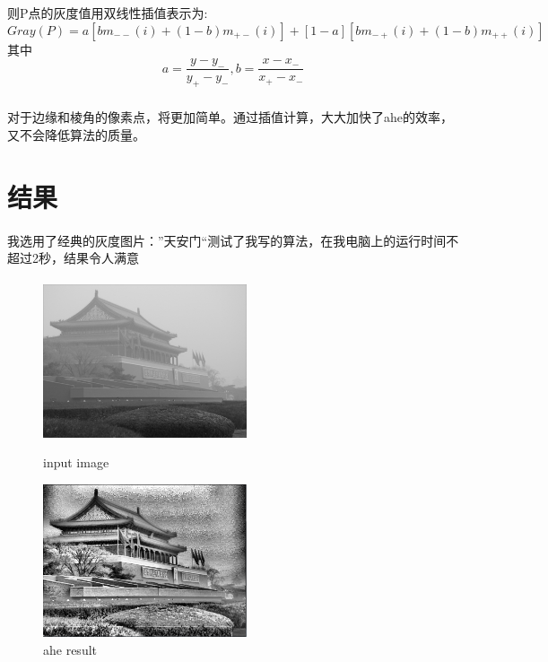 \documentclass{article}
\begin{document}
        则P点的灰度值用双线性插值表示为:
        \begin{equation}
            Gray(P) = a[bm_{--}(i)+(1-b)m_{+-}(i)]+[1-a][bm_{-+}(i)+(1-b)m_{++}(i)]
        \end{equation}
        其中
        \begin{equation*}
            a = \frac{y-y_{-}}{y_{+}-y_{-}},  b = \frac{x-x_{-}}{x_{+}-x_{-}}
        \end{equation*}
        \subparagraph{}
        对于边缘和棱角的像素点，将更加简单。通过插值计算，大大加快了ahe的效率，又不会降低算法的质量。
    \section{结果}
        \paragraph{}我选用了经典的灰度图片：”天安门“测试了我写的算法，在我电脑上的运行时间不超过2秒，结果令人满意\\
        \paragraph{}
         \begin{figure}[htbp!]
                \begin{minipage}[t]{0.5\linewidth}\centering
                \includegraphics[width=6cm]{test.png}
                \caption{input image}\label{2-a}
                \end{minipage}
                \begin{minipage}[t]{0.5\linewidth}\centering
                \includegraphics[width=6cm]{result.png}
                \caption{ahe result}\label{2-b}
                \end{minipage}
        \end{figure}
   
\end{document}

